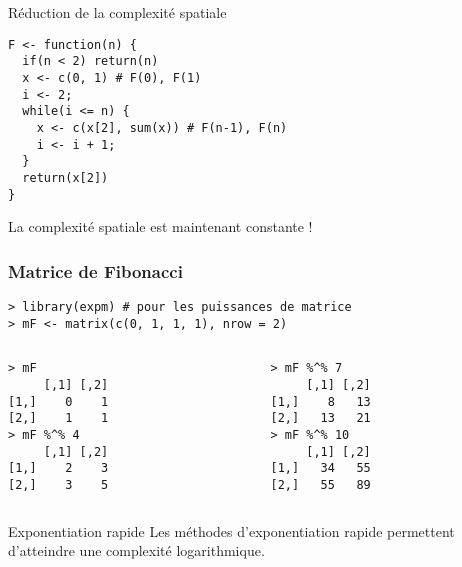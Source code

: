 \documentclass[10pt]{beamer}
\newcommand{\F}[1]{\ensuremath{{\cal F}_{#1}}\xspace}
\begin{document}
\begin{frame}[fragile]{Réduction de la complexité spatiale}

    \begin{lstlisting}[style=edblock]
F <- function(n) {
  if(n < 2) return(n)
  x <- c(0, 1) # F(0), F(1)
  i <- 2;
  while(i <= n) {
    x <- c(x[2], sum(x)) # F(n-1), F(n)
    i <- i + 1;
  }
  return(x[2])
}
\end{lstlisting}
%
\begin{alertblock}{La complexité spatiale est maintenant constante !}


\end{alertblock}
\end{frame}

\begin{frame}[fragile]
  \frametitle{Matrice de Fibonacci }
  \begin{lstlisting}
> library(expm) # pour les puissances de matrice
> mF <- matrix(c(0, 1, 1, 1), nrow = 2)
\end{lstlisting}

\begin{columns}[t]
\begin{column}{0.48\textwidth}
  \begin{lstlisting}
> mF
     [,1] [,2]
[1,]    0    1
[2,]    1    1
> mF %^% 4
     [,1] [,2]
[1,]    2    3
[2,]    3    5
\end{lstlisting}

\end{column}
\begin{column}{0.48\textwidth}
  \begin{lstlisting}
> mF %^% 7
     [,1] [,2]
[1,]    8   13
[2,]   13   21
> mF %^% 10
     [,1] [,2]
[1,]   34   55
[2,]   55   89
\end{lstlisting}

\end{column}
\end{columns}


\begin{block}{Exponentiation rapide}
  Les méthodes d'exponentiation rapide permettent d'atteindre une \alert{complexité logarithmique}.
\end{block}
\end{frame}
\end{document}
